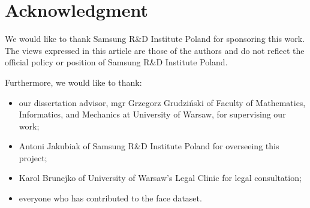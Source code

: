 \section*{Acknowledgment}
We would like to thank Samsung R\&D Institute Poland for sponsoring this work.
The views expressed in this article are those of the authors and do not reflect
the official policy or position of Samsung R\&D Institute Poland.

\bigskip \noindent
Furthermore, we would like to thank:
\begin{itemize}
    \item our dissertation advisor,  mgr Grzegorz Grudziński of Faculty of Mathematics,
          Informatics, and Mechanics at University of Warsaw, for supervising our work;
    \item Antoni Jakubiak of Samsung R\&D Institute Poland for overseeing this project;
    \item Karol Brunejko of University of Warsaw's Legal Clinic for legal consultation;
    \item everyone who has contributed to the face dataset.
\end{itemize}
